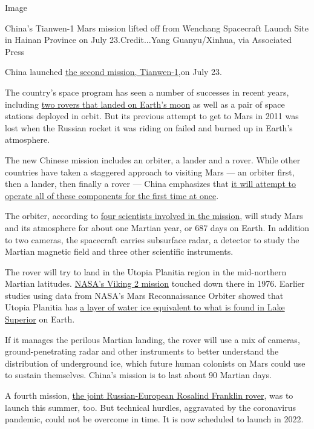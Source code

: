 Image

China's Tianwen-1 Mars mission lifted off from Wenchang Spacecraft
Launch Site in Hainan Province on July 23.Credit...Yang Guanyu/Xinhua,
via Associated Press

China launched
\href{https://www.nytimes3xbfgragh.onion/2020/07/22/science/mars-china-launch.html}{the
second mission, Tianwen-1,}on July 23.

The country's space program has seen a number of successes in recent
years, including
\href{https://www.nytimes3xbfgragh.onion/2020/02/26/science/china-moon-far-side.html}{two
rovers that landed on Earth's moon} as well as a pair of space stations
deployed in orbit. But its previous attempt to get to Mars in 2011 was
lost when the Russian rocket it was riding on failed and burned up in
Earth's atmosphere.

The new Chinese mission includes an orbiter, a lander and a rover. While
other countries have taken a staggered approach to visiting Mars --- an
orbiter first, then a lander, then finally a rover --- China emphasizes
that
\href{https://www.nytimes3xbfgragh.onion/2020/07/22/science/china-mars-mission.html}{it
will attempt to operate all of these components for the first time at
once}.

The orbiter, according to
\href{https://www.nature.com/articles/s41550-020-1148-6}{four scientists
involved in the mission}, will study Mars and its atmosphere for about
one Martian year, or 687 days on Earth. In addition to two cameras, the
spacecraft carries subsurface radar, a detector to study the Martian
magnetic field and three other scientific instruments.

The rover will try to land in the Utopia Planitia region in the
mid-northern Martian latitudes.
\href{https://mars.nasa.gov/mars-exploration/missions/viking-1-2/}{NASA's
Viking 2 mission} touched down there in 1976. Earlier studies using data
from NASA's Mars Reconnaissance Orbiter showed that Utopia Planitia has
\href{https://www.jpl.nasa.gov/news/news.php?feature=6680}{a layer of
water ice equivalent to what is found in Lake Superior} on Earth.

If it manages the perilous Martian landing, the rover will use a mix of
cameras, ground-penetrating radar and other instruments to better
understand the distribution of underground ice, which future human
colonists on Mars could use to sustain themselves. China's mission is to
last about 90 Martian days.

A fourth mission,
\href{https://www.nytimes3xbfgragh.onion/2020/03/12/science/mars-rover-coronavirus.html}{the
joint Russian-European Rosalind Franklin rover}, was to launch this
summer, too. But technical hurdles, aggravated by the coronavirus
pandemic, could not be overcome in time. It is now scheduled to launch
in 2022.


